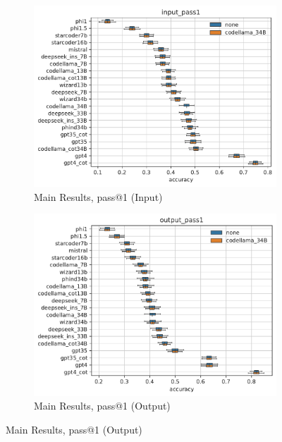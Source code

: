 \begin{figure}[H]
     \centering
     \begin{subfigure}[b]{0.49\textwidth}
         \centering
         \includegraphics[scale=0.4]{figs/main_results/main_box_input_pass1.pdf}
         \caption{Main Results, pass@1 (Input)}
         \label{fig:main-results-pass1-input-appendix}
     \end{subfigure}
     \hfill
     \begin{subfigure}[b]{0.49\textwidth}
         \centering
         \includegraphics[scale=0.4]{figs/main_results/main_box_output_pass1.pdf}
         \caption{Main Results, pass@1 (Output)}
         \label{fig:main-results-pass1-output-appendix}
     \end{subfigure}

\end{figure}
